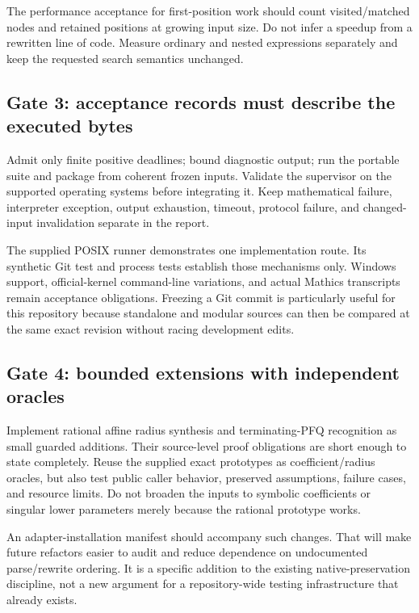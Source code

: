 \documentclass[11pt,letterpaper]{article}
\begin{document}
The performance acceptance for first-position work should count visited/matched nodes and retained positions at growing input size. Do not infer a speedup from a rewritten line of code. Measure ordinary and nested expressions separately and keep the requested search semantics unchanged.

\subsection{Gate 3: acceptance records must describe the executed bytes}

Admit only finite positive deadlines; bound diagnostic output; run the portable suite and package from coherent frozen inputs. Validate the supervisor on the supported operating systems before integrating it. Keep mathematical failure, interpreter exception, output exhaustion, timeout, protocol failure, and changed-input invalidation separate in the report.

The supplied POSIX runner demonstrates one implementation route. Its synthetic Git test and process tests establish those mechanisms only. Windows support, official-kernel command-line variations, and actual Mathics transcripts remain acceptance obligations. Freezing a Git commit is particularly useful for this repository because standalone and modular sources can then be compared at the same exact revision without racing development edits.

\subsection{Gate 4: bounded extensions with independent oracles}

Implement rational affine radius synthesis and terminating-PFQ recognition as small guarded additions. Their source-level proof obligations are short enough to state completely. Reuse the supplied exact prototypes as coefficient/radius oracles, but also test public caller behavior, preserved assumptions, failure cases, and resource limits. Do not broaden the inputs to symbolic coefficients or singular lower parameters merely because the rational prototype works.

An adapter-installation manifest should accompany such changes. That will make future refactors easier to audit and reduce dependence on undocumented parse/rewrite ordering. It is a specific addition to the existing native-preservation discipline, not a new argument for a repository-wide testing infrastructure that already exists.
\end{document}
